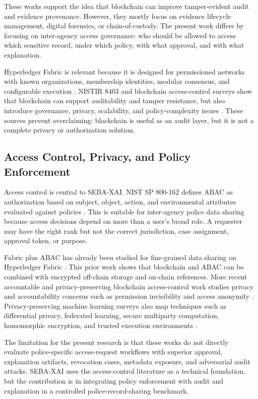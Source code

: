 These works support the idea that blockchain can improve tamper-evident audit and evidence provenance. However, they mostly focus on evidence lifecycle management, digital forensics, or chain-of-custody. The present work differs by focusing on inter-agency access governance: who should be allowed to access which sensitive record, under which policy, with what approval, and with what explanation.

Hyperledger Fabric is relevant because it is designed for permissioned networks with known organizations, membership identities, modular consensus, and configurable execution \cite{androulaki_fabric_2018}. NISTIR 8403 and blockchain access-control surveys show that blockchain can support auditability and tamper resistance, but also introduce governance, privacy, scalability, and policy-complexity issues \cite{nist_blockchain_access_2022,rouhani_access_control_survey_2019}. These sources prevent overclaiming: blockchain is useful as an audit layer, but it is not a complete privacy or authorization solution.

\subsection{Access Control, Privacy, and Policy Enforcement}

Access control is central to SEBA-XAI. NIST SP 800-162 defines ABAC as authorization based on subject, object, action, and environmental attributes evaluated against policies \cite{nist_abac_2014}. This is suitable for inter-agency police data sharing because access decisions depend on more than a user's broad role. A requester may have the right rank but not the correct jurisdiction, case assignment, approval token, or purpose.

Fabric plus ABAC has already been studied for fine-grained data sharing on Hyperledger Fabric \cite{zhao_fabric_abac_2022}. This prior work shows that blockchain and ABAC can be combined with encrypted off-chain storage and on-chain references. More recent accountable and privacy-preserving blockchain access-control work studies privacy and accountability concerns such as permission invisibility and access anonymity \cite{hu_accountable_private_ac_2024}. Privacy-preserving machine learning surveys also map techniques such as differential privacy, federated learning, secure multiparty computation, homomorphic encryption, and trusted execution environments \cite{xu_ppml_survey_2021,abadi_dp_sgd_2016}.

The limitation for the present research is that these works do not directly evaluate police-specific access-request workflows with superior approval, explanation artifacts, revocation cases, metadata exposure, and adversarial audit attacks. SEBA-XAI uses the access-control literature as a technical foundation, but the contribution is in integrating policy enforcement with audit and explanation in a controlled police-record-sharing benchmark.


